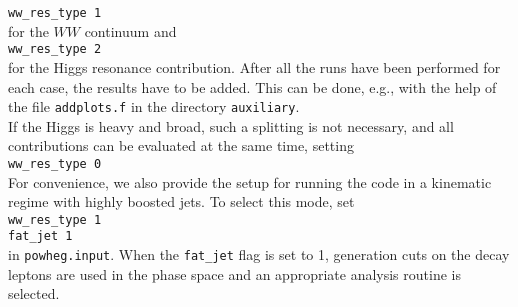 \documentclass[a4paper,11pt]{article}
\begin{document}
{\tt ww\_res\_type 1}
\\[2ex]
for the $WW$ continuum and
\\[2ex]
{\tt ww\_res\_type 2}
\\[2ex]
for the Higgs resonance contribution. After all the runs have been
performed for each case, the results have to be added. This can be
done, e.g., with the help of the file {\tt addplots.f} in the
directory {\tt auxiliary}. 
\\[2ex]
If the Higgs is heavy and broad, such a splitting is not necessary,
and all contributions can be evaluated at the same time, setting
\\[2ex]
{\tt ww\_res\_type 0}
\\[2ex]
%
For convenience, we also provide the setup for running the code in a kinematic regime with highly boosted jets. To select this mode, set 
\\[2ex]
{\tt ww\_res\_type 1}
\\
{\tt fat\_jet 1}
\\[2ex]
in {\tt powheg.input}. When the {\tt fat\_jet} flag is set to 1, generation cuts on the decay leptons are used in the 
phase space and an appropriate analysis routine is selected. 
\end{document}
